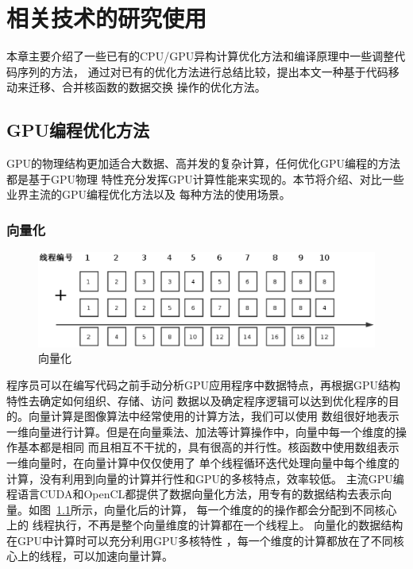 \chapter{相关技术的研究使用}
本章主要介绍了一些已有的CPU/GPU异构计算优化方法和编译原理中一些调整代码序列的方法，
通过对已有的优化方法进行总结比较，提出本文一种基于代码移动来迁移、合并核函数的数据交换
操作的优化方法。

\section{GPU编程优化方法}
GPU的物理结构更加适合大数据、高并发的复杂计算，任何优化GPU编程的方法都是基于GPU物理
特性充分发挥GPU计算性能来实现的。本节将介绍、对比一些业界主流的GPU编程优化方法以及
每种方法的使用场景。

\subsection{向量化}
\begin{figure}
\centering
\includegraphics[width=0.9\linewidth]{figure3.eps}
\caption{向量化}\label{figure3}
\end{figure}
程序员可以在编写代码之前手动分析GPU应用程序中数据特点，再根据GPU结构特性去确定如何组织、存储、访问
数据以及确定程序逻辑可以达到优化程序的目的。向量计算是图像算法中经常使用的计算方法，我们可以使用
数组很好地表示一维向量进行计算。但是在向量乘法、加法等计算操作中，向量中每一个维度的操作基本都是相同
而且相互不干扰的，具有很高的并行性。核函数中使用数组表示一维向量时，在向量计算中仅仅使用了
单个线程循环迭代处理向量中每个维度的计算，没有利用到向量的计算并行性和GPU的多核特点，效率较低。
主流GPU编程语言CUDA和OpenCL都提供了数据向量化方法，用专有的数据结构去表示向量。如图~\ref{figure3}所示，向量化后的计算，
每一个维度的的操作都会分配到不同核心上的
线程执行，不再是整个向量维度的计算都在一个线程上。
向量化的数据结构在GPU中计算时可以充分利用GPU多核特性
，每一个维度的计算都放在了不同核心上的线程，可以加速向量计算。

